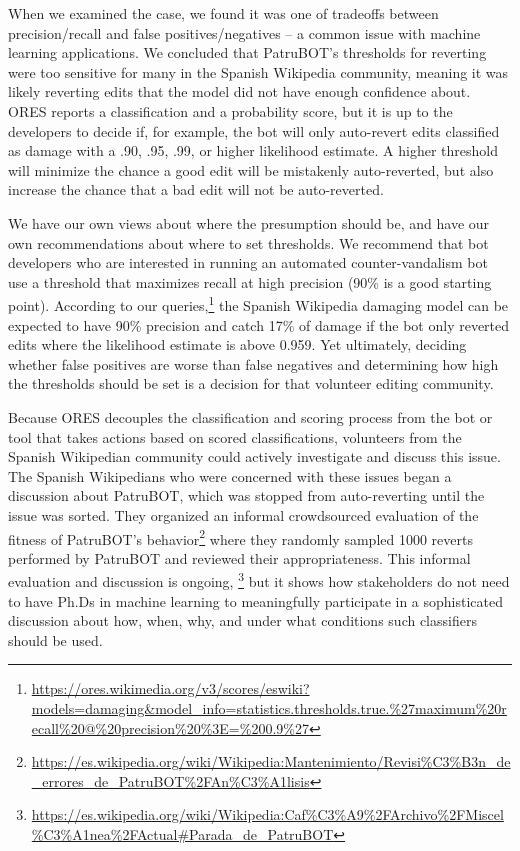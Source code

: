 When we examined the case, we found it was one of tradeoffs between precision/recall and false positives/negatives -- a common issue with machine learning applications. We concluded that PatruBOT's thresholds for reverting were too sensitive for many in the Spanish Wikipedia community, meaning it was likely reverting edits that the model did not have enough confidence about. ORES reports a classification and a probability score, but it is up to the developers to decide if, for example, the bot will only auto-revert edits classified as damage with a .90, .95, .99, or higher likelihood estimate. A higher threshold will minimize the chance a good edit will be mistakenly auto-reverted, but also increase the chance that a bad edit will not be auto-reverted.

We have our own views about where the presumption should be, and have our own recommendations about where to set thresholds. We recommend that bot developers who are interested in running an automated counter-vandalism bot use a threshold that maximizes recall at high precision (90\% is a good starting point). According to our queries,\footnote{\url{https://ores.wikimedia.org/v3/scores/eswiki?models=damaging&model_info=statistics.thresholds.true.\%27maximum\%20recall\%20@\%20precision\%20\%3E=\%200.9\%27}} the Spanish Wikipedia damaging model can be expected to have 90\% precision and catch 17\% of damage if the bot only reverted edits where the likelihood estimate is above 0.959. Yet ultimately, deciding whether false positives are worse than false negatives and determining how high the thresholds should be set is a decision for that volunteer editing community.

Because ORES decouples the classification and scoring process from the bot or tool that takes actions based on scored classifications, volunteers from the Spanish Wikipedian community could actively investigate and discuss this issue. The Spanish Wikipedians who were concerned with these issues began a discussion about PatruBOT, which was stopped from auto-reverting until the issue was sorted. They organized an informal crowdsourced evaluation of the fitness of PatruBOT's behavior\footnote{\url{https://es.wikipedia.org/wiki/Wikipedia:Mantenimiento/Revisi\%C3\%B3n_de_errores_de_PatruBOT\%2FAn\%C3\%A1lisis}} where they randomly sampled 1000 reverts performed by PatruBOT and reviewed their appropriateness. This informal evaluation and discussion is ongoing, \footnote{\url{https://es.wikipedia.org/wiki/Wikipedia:Caf\%C3\%A9\%2FArchivo\%2FMiscel\%C3\%A1nea\%2FActual\#Parada_de_PatruBOT}} but it shows how stakeholders do not need to have Ph.Ds in machine learning to meaningfully participate in a sophisticated discussion about how, when, why, and under what conditions such classifiers should be used.


